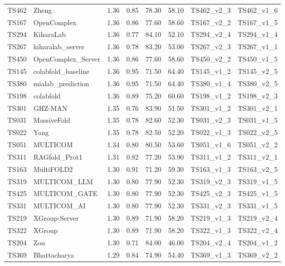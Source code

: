 \begin{table}[ht]
{\begin{tabular}{llllllll}
TS462 & Zheng & 1.36 & 0.85 & 78.30 & 58.10 & TS462\_v2\_3 & TS462\_v1\_6 \\ 
TS167 & OpenComplex & 1.36 & 0.86 & 77.60 & 58.60 & TS167\_v2\_2 & TS167\_v1\_5 \\ 
TS294 & KiharaLab & 1.36 & 0.77 & 84.10 & 52.10 & TS294\_v2\_4 & TS294\_v1\_4 \\ 
TS267 & kiharalab\_server & 1.36 & 0.78 & 83.20 & 53.00 & TS267\_v2\_3 & TS267\_v1\_1 \\ 
TS450 & OpenComplex\_Server & 1.36 & 0.86 & 77.60 & 58.60 & TS450\_v2\_2 & TS450\_v1\_5 \\ 
TS145 & colabfold\_baseline & 1.36 & 0.95 & 71.50 & 64.40 & TS145\_v1\_2 & TS145\_v2\_5 \\ 
TS380 & mialab\_prediction & 1.36 & 0.95 & 71.50 & 64.40 & TS380\_v1\_4 & TS380\_v2\_5 \\ 
TS198 & colabfold & 1.36 & 0.89 & 75.20 & 60.60 & TS198\_v1\_2 & TS198\_v2\_3 \\ 
TS301 & GHZ-MAN & 1.35 & 0.76 & 83.90 & 51.50 & TS301\_v1\_2 & TS301\_v2\_1 \\ 
TS031 & MassiveFold & 1.35 & 0.78 & 82.60 & 52.30 & TS031\_v2\_3 & TS031\_v1\_5 \\ 
TS022 & Yang & 1.35 & 0.78 & 82.50 & 52.20 & TS022\_v1\_3 & TS022\_v2\_5 \\ 
TS051 & MULTICOM & 1.34 & 0.80 & 80.50 & 53.60 & TS051\_v1\_6 & TS051\_v2\_2 \\ 
TS311 & RAGfold\_Prot1 & 1.31 & 0.82 & 77.20 & 53.90 & TS311\_v1\_2 & TS311\_v2\_1 \\ 
TS163 & MultiFOLD2 & 1.30 & 0.91 & 71.20 & 59.30 & TS163\_v1\_3 & TS163\_v2\_5 \\ 
TS319 & MULTICOM\_LLM & 1.30 & 0.80 & 77.90 & 52.30 & TS319\_v2\_3 & TS319\_v1\_5 \\ 
TS425 & MULTICOM\_GATE & 1.30 & 0.80 & 77.90 & 52.30 & TS425\_v2\_3 & TS425\_v1\_5 \\ 
TS331 & MULTICOM\_AI & 1.30 & 0.80 & 77.90 & 52.30 & TS331\_v2\_3 & TS331\_v1\_5 \\ 
TS219 & XGroup-Server & 1.30 & 0.89 & 71.90 & 58.20 & TS219\_v1\_3 & TS219\_v2\_4 \\ 
TS322 & XGroup & 1.30 & 0.89 & 71.90 & 58.20 & TS322\_v1\_3 & TS322\_v2\_4 \\ 
TS204 & Zou & 1.30 & 0.71 & 84.00 & 46.00 & TS204\_v2\_4 & TS204\_v1\_2 \\ 
TS369 & Bhattacharya & 1.29 & 0.84 & 74.90 & 54.40 & TS369\_v1\_3 & TS369\_v2\_2 \\ 

\end{tabular}}
\end{table}

